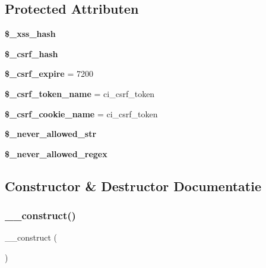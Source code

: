 \subsection*{Protected Attributen}
\begin{DoxyCompactItemize}
\item 
\mbox{\label{class_c_i___security_aca426a0e87199bfa36c7401a1d06a419}} 
{\bfseries \$\+\_\+xss\+\_\+hash}
\item 
\mbox{\label{class_c_i___security_a8bf24cc529f04164ac20d892ce20d721}} 
{\bfseries \$\+\_\+csrf\+\_\+hash}
\item 
\mbox{\label{class_c_i___security_af86a83f20de2a3c522bf690d4080c08e}} 
{\bfseries \$\+\_\+csrf\+\_\+expire} = 7200
\item 
\mbox{\label{class_c_i___security_a6752ebca4be235c079785a87a693d932}} 
{\bfseries \$\+\_\+csrf\+\_\+token\+\_\+name} = \textquotesingle{}ci\+\_\+csrf\+\_\+token\textquotesingle{}
\item 
\mbox{\label{class_c_i___security_a52043f2c9ffb0e14eade8e67a0172a82}} 
{\bfseries \$\+\_\+csrf\+\_\+cookie\+\_\+name} = \textquotesingle{}ci\+\_\+csrf\+\_\+token\textquotesingle{}
\item 
{\bfseries \$\+\_\+never\+\_\+allowed\+\_\+str}
\item 
{\bfseries \$\+\_\+never\+\_\+allowed\+\_\+regex}
\end{DoxyCompactItemize}


\subsection{Constructor \& Destructor Documentatie}
\mbox{\label{class_c_i___security_a095c5d389db211932136b53f25f39685}} 
\subsubsection{\texorpdfstring{\_\_construct()}{\_\_construct()}}
{\footnotesize\ttfamily \+\_\+\+\_\+construct (\begin{DoxyParamCaption}{ }\end{DoxyParamCaption})}

